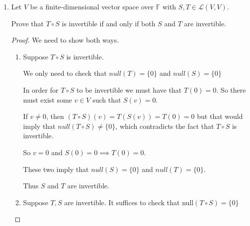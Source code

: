 \documentclass[12pt,letterpaper]{article}
\begin{document}
\begin{enumerate}
\begin{proof}
        Now, since $T$ is a linear map,
        \begin{align*}
          w &= T(v) \\
          &= T(a_1v_1 + a_2v_2 + \dots + a_nv_n) \\
          &= T(a_1v_1) + T(a_2v_2) + \dots + T(a_nv_n) \\
          &= a_1T(v_1) + a_2T(v_2) + \dots + a_nT(v_n)
        \end{align*}

        Since our choice for $w$ was arbitrary, we can find all $w \in W$ this way.

        So we have that $\forall w \in W, w \in \text{ span }(T(V))$.

        Or put another way, span$(T(v_1), \dots, T(v_n)) = W$
      \end{proof}

    \item
      Let $V$ be a finite-dimensional vector space over $\mathbb{F}$
      with $S, T \in \mathcal{L}(V, V)$.

      Prove that $T \circ S$ is invertible if and only if both $S$ and $T$ are invertible.

      \begin{proof}
        We need to show both ways.

        \begin{enumerate}
          \item
            Suppose $T \circ S$ is invertible.

            We only need to check that $null(T) = \{0\}$ and $null(S) = \{0\}$

            In order for $T \circ S$ to be invertible we must have that $T(0) = 0$.
            So there must exist some $v \in V$ such that $S(v) = 0$.

            If $v \neq 0$, then $(T \circ S)(v) = T(S(v)) = T(0) = 0$
            but that would imply that $null(T \circ S) \neq \{0\}$, which contradicts the fact that $T \circ S$ is invertible.

            So $v = 0$ and $S(0) = 0 \implies T(0) = 0$.

            These two imply that $null(S) = \{0\}$ and $null(T) = \{0\}$.

            Thus $S$ and $T$ are invertible.
          \item
            Suppose $T, S$ are invertible.
            It suffices to check that null$(T \circ S) = \{0\}$


\end{enumerate}
\end{proof}
\end{enumerate}
\end{document}
